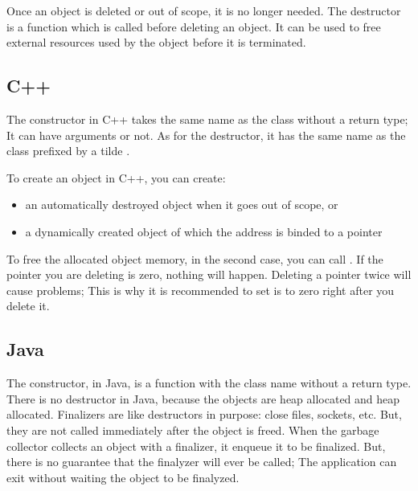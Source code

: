 \documentclass{KodeBook}
\begin{document}
Once an object is deleted or out of scope, it is no longer needed. 
The destructor is a function which is called before deleting an object.
It can be used to free external resources used by the object before it is terminated.

\subsection{C++}

The constructor in C++ takes the same name as the class without a return type;
It can have arguments or not.
As for the destructor, it has the same name as the class prefixed by a tilde \keyword{\~}.



To create an object in C++, you can create:
\begin{itemize}
	\item an automatically destroyed object when it goes out of scope, or
	\item a dynamically created object of which the address is binded to a pointer
\end{itemize}



To free the allocated object memory, in the second case, you can call . 
If the pointer you are deleting is zero, nothing will happen. 
Deleting a pointer twice will cause problems; This is why it is recommended to set is to zero right after you delete it.



\subsection{Java}

The constructor, in Java, is a function with the class name without a return type.
There is no destructor in Java, because the objects are heap allocated and heap allocated. 
Finalizers are like destructors in purpose: close files, sockets, etc. 
But, they are not called immediately after the object is freed. 
When the garbage collector collects an object with a finalizer, it enqueue it to be finalized. 
But, there is no guarantee that the finalyzer will ever be called; The application can exit without waiting the object to be finalyzed. 
\end{document}
